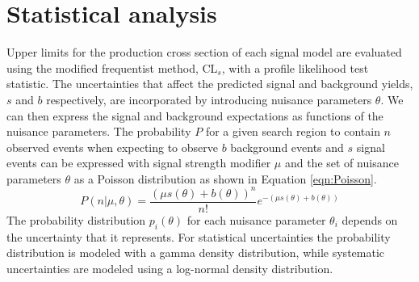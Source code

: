 \section{Statistical analysis}
Upper limits for the production cross section of each signal model are evaluated using the modified frequentist method, CL$_s$, with a profile likelihood test statistic.  The uncertainties that affect the predicted signal and background yields, $s$ and $b$ respectively, are incorporated by introducing nuisance parameters $\theta$.  We can then express the signal and background expectations as functions of the nuisance parameters.  The probability $P$ for a given search region to contain $n$ observed events when expecting to observe $b$ background events and $s$ signal events can be expressed with signal strength modifier $\mu$ and the set of nuisance parameters $\theta$ as a Poisson distribution as shown in Equation \ref{eqn:Poisson}.  
\begin{equation}
	P(n|\mu , \theta) = \frac{(\mu s(\theta)+b(\theta))^{n}}{n!}e^{-(\mu s(\theta) + b(\theta))}
	\label{eqn:Poisson}
\end{equation}
The probability distribution $p_i(\theta)$ for each nuisance parameter $\theta_i$ depends on the uncertainty that it represents.  For statistical uncertainties the probability distribution is modeled with a gamma density distribution, while systematic uncertainties are modeled using a log-normal density distribution.

